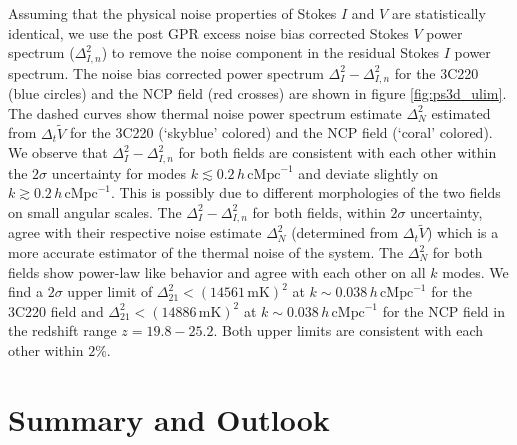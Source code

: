 \documentclass[fleqn,usenatbib]{mnras}
\begin{document}
Assuming that the physical noise properties of Stokes $I$ and $V$ are statistically identical, we use the post GPR excess noise bias corrected Stokes $V$ power spectrum ($\Delta_{I,n}^2$) to remove the noise component in the residual Stokes $I$ power spectrum. The noise bias corrected power spectrum $\Delta_I^2 - \Delta_{I,n}^2$ for the 3C220 (blue circles) and the NCP field (red crosses) are shown in figure \ref{fig:ps3d_ulim}. The dashed curves show thermal noise power spectrum estimate $\Delta^2_N$ estimated from $\Delta_t\tilde{V}$ for the 3C220 (`skyblue' colored) and the NCP field (`coral' colored). We observe that $\Delta_I^2 - \Delta_{I,n}^2$ for both fields are consistent with each other within the $2\sigma$ uncertainty for modes $k\lesssim 0.2\,h\,\text{cMpc}^{-1}$ and deviate slightly on $k\gtrsim 0.2\,h\,\text{cMpc}^{-1}$.  This is possibly due to different morphologies of the two fields on small angular scales. The $\Delta_I^2 - \Delta_{I,n}^2$ for both fields, within $2\sigma$ uncertainty, agree with their respective noise estimate $\Delta_N^2$ (determined from $\Delta_t\tilde{V}$) which is a more accurate estimator of the thermal noise of the system. The $\Delta_N^2$ for both fields show power-law like behavior and agree with each other on all $k$ modes. We find a $2\sigma$ upper limit of $\Delta_{21}^2 < (14561\,\text{mK})^2$ at $k\sim 0.038\,h\,\text{cMpc}^{-1}$ for the 3C220 field and $\Delta_{21}^2 < (14886\,\text{mK})^2$ at $k\sim 0.038\,h\,\text{cMpc}^{-1}$ for the NCP field in the redshift range $z = 19.8-25.2$. Both upper limits are consistent with each other within $2\%$. 

\section{Summary and Outlook}\label{sec:conclusions}
\end{document}

